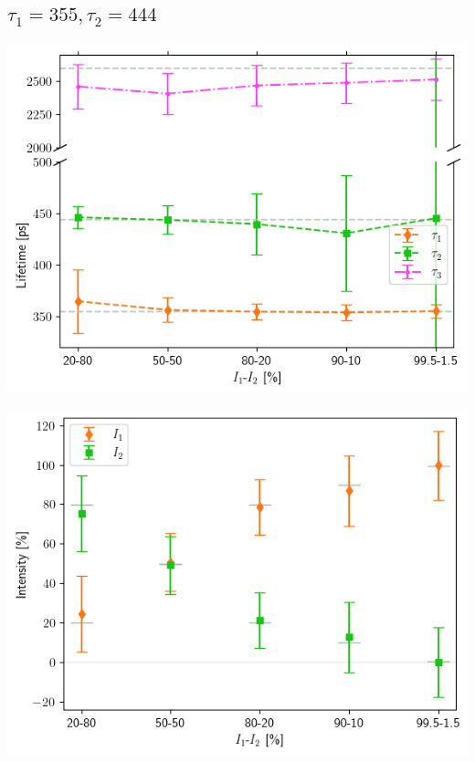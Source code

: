 \vfill
\subsection{\boldmath$\tau_1=355, \tau_2=444$\unboldmath}


\begin{minipage}{.47\linewidth}
     
    \includegraphics[width=\linewidth]{Batch 7/355-444/output/3 life/lifetimes.png}
    \label{fig:355-444-3life}
\end{minipage}
\hfill
\begin{minipage}{.47\linewidth}
     
    \includegraphics[width=\linewidth]{Batch 7/355-444/output/3 life/intensities.png}
    \label{fig:355-444-3lifeint}
\end{minipage}

